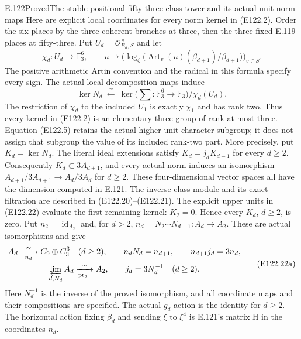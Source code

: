 \begin{statement}{E.122}{Proved}{The stable positional fifty-three class tower and its actual unit-norm maps}
Here are explicit local coordinates for every norm kernel in (E122.2).
Order the six places by the three coherent branches at three,
then the three fixed E.119 places at fifty-three. Put
$U_d=\mathcal O_{B_d,S}^{\times}$ and let
\[
 \chi_d:U_d\longrightarrow\mathbb F_3^6,
 \qquad
 u\longmapsto
 \bigl(\log_\zeta\bigl(\operatorname{Art}_v(u)
          (\beta_{d+1})/\beta_{d+1}\bigr)\bigr)_{v\in S}.
 \tag{E122.4}
\]
The positive arithmetic Artin convention and the radical in this
formula specify every sign. The actual local decomposition maps induce
\[
 \ker N_d\ \xleftarrow{\ \sim\ }\ 
 \ker\bigl(\textstyle\sum:\mathbb F_3^6\to\mathbb F_3\bigr)
             /\chi_d(U_d).
 \tag{E122.5}
\]
The restriction of $\chi_d$ to the included $U_1$ is exactly
$\chi_1$ and has rank two. Thus every kernel in (E122.2)
is an elementary three-group of rank at most three.
Equation (E122.5) retains the actual higher unit-character subgroup;
it does not assign that subgroup the value of its included rank-two
part.
More precisely, put $K_d=\ker N_d$. The literal ideal extensions
satisfy $K_d=j_dK_{d-1}$ for every $d\ge2$.
Consequently $K_d\subset3A_{d+1}$, and every actual norm induces
an isomorphism $A_{d+1}/3A_{d+1}\to A_d/3A_d$ for $d\ge2$.
These four-dimensional vector spaces all have the dimension computed
in E.121. The inverse class module and its exact filtration are
described in (E122.20)--(E122.21).
The explicit upper units in (E122.22) evaluate the first remaining
kernel: $K_2=0$. Hence every $K_d$, $d\ge2$, is zero. Put
$n_2=\operatorname{id}_{A_2}$ and, for $d>2$,
$n_d=N_2\cdots N_{d-1}:A_d\to A_2$. These are actual isomorphisms
and give
\[
 \begin{gathered}
 A_d\xrightarrow[\ n_d\ ]{\sim}C_9\oplus C_3^3\quad(d\ge2),
 \qquad n_dN_d=n_{d+1},\qquad n_{d+1}j_d=3n_d,\\
 \varprojlim_{d,N_d}A_d\xrightarrow[\mathrm{pr}_2\ ]{\sim}A_2,
 \qquad j_d=3N_d^{-1}\quad(d\ge2).
 \end{gathered}
 \tag{E122.22a}
\]
Here $N_d^{-1}$ is the inverse of the proved isomorphism, and all
coordinate maps and their compositions are specified. The actual
$g_d$ action is the identity for $d\ge2$. The horizontal action
fixing $\beta_d$ and sending $\xi$ to $\xi^4$ is E.121's matrix H
in the coordinates $n_d$.


\end{statement}
